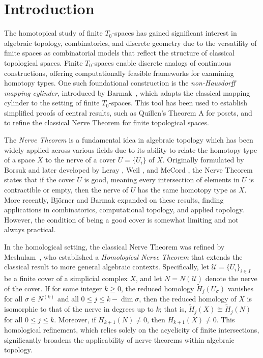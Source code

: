 \documentclass[12pt,a4paper,twoside, reqno, tbtags]{article}
\numberwithin{equation}{section}
\begin{document}
\section{Introduction}

The homotopical study of finite \( T_0 \)-spaces has gained significant interest in algebraic topology, combinatorics, and discrete geometry due to the versatility of finite spaces as combinatorial models that reflect the structure of classical topological spaces. Finite \( T_0 \)-spaces enable discrete analogs of continuous constructions, offering computationally feasible frameworks for examining homotopy types. One such foundational construction is the \emph{non-Hausdorff mapping cylinder}, introduced by Barmak~\cite{Barmak}, which adapts the classical mapping cylinder to the setting of finite $T_0$-spaces. This tool has been used to establish simplified proofs of central results, such as Quillen's Theorem A for posets, and to refine the classical Nerve Theorem for finite topological spaces.


\noindent The \textit{Nerve Theorem} is a fundamental idea in algebraic topology which has been widely applied across various fields due to its ability to relate the homotopy type of a space \( X \) to the nerve of a cover \( U = \{ U_i \} \) of $X$. Originally formulated by Borsuk \cite{Borsuk} and later developed by Leray \cite{Leray}, Weil \cite{Weil}, and McCord \cite{McCord}, the Nerve Theorem states that if the cover \( U \) is good, meaning every intersection of elements in \( U \) is contractible or empty, then the nerve of \( U \) has the same homotopy type as \( X \). More recently, Björner \cite{Bjorner} and Barmak \cite{Barmak} expanded on these results, finding applications in combinatorics, computational topology, and applied topology. However, the condition of being a good cover is somewhat limiting and not always practical.

\noindent In the homological setting, the classical Nerve Theorem was refined by Meshulam~\cite{Meshulam}, who established a \textit{Homological Nerve Theorem} that extends the classical result to more general algebraic contexts. Specifically, let \(\mathcal{U} = \{U_i\}_{i \in I}\) be a finite cover of a simplicial complex \(X\), and let \(N = N(\mathcal{U})\) denote the nerve of the cover. If for some integer \(k \geq 0\), the reduced homology \(\widetilde{H}_j(U_\sigma)\) vanishes for all \(\sigma \in N^{(k)}\) and all \(0 \leq j \leq k - \dim \sigma\), then the reduced homology of \(X\) is isomorphic to that of the nerve in degrees up to \(k\); that is, \(\widetilde{H}_j(X) \cong \widetilde{H}_j(N)\) for all \(0 \leq j \leq k\). Moreover, if \(H_{k+1}(N) \neq 0\), then \(H_{k+1}(X) \neq 0\). This homological refinement, which relies solely on the acyclicity of finite intersections, significantly broadens the applicability of nerve theorems within algebraic topology.
\end{document}
